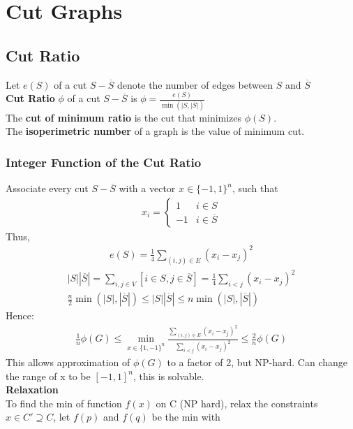 \documentclass[12pt, letterpaper]{report}
\begin{document}
    \section{Cut Graphs}
    \subsection{Cut Ratio}
    Let $e(S)$ of a cut $S-\overline{S}$ denote the number of edges between $S$ and $\overline{S}$\\
    \textbf{Cut Ratio} $\phi$ of a cut $S-\overline{S}$ is $\phi = \frac{e(S)}{\min(|S, |\overline{S}|)}$\\
    The \textbf{cut of minimum ratio} is the cut that minimizes $\phi(S)$.\\The \textbf{isoperimetric number} of a graph is the value of minimum cut.
    \subsubsection{Integer Function of the Cut Ratio}
    Associate every cut $S-\overline{S}$ with a vector $x\in \{-1, 1\}^n$, such that
    \begin{gather*}
        x_i = \begin{cases}
            1 & i \in S\\
            -1 & i \in \overline{S}
        \end{cases}
    \end{gather*}
    Thus,
    \begin{gather*}
        e(S) = \frac{1}{4} \sum_{(i,j)\in E}(x_i-x_j)^2
    \end{gather*}
    \begin{gather*}
        |S||\overline{S}| = \sum_{i,j \in V}[i \in S, j \in \overline{S}] = \frac{1}{4}\sum_{i<j}(x_i-x_j)^2\\
        \frac{n}{2}\min(|S|,|\overline{S}|)\leq |S||\overline{S}| \leq n \min{(|S|, |\overline{S}|)}
    \end{gather*}
    Hence:
    \begin{gather*}
        \frac{1}{n}\phi(G) \leq \min_{x\in \{1,-1\}^n}\frac{\sum_{(i,j)\in E}(x_i-x_j)^2}{\sum_{i<j}(x_i-x_j)^2} \leq \frac{2}{n}\phi(G)
    \end{gather*}
    This allows approximation of $\phi(G)$ to a factor of 2, but NP-hard. Can change the range of x to be $[-1, 1]^n$, this is solvable.\\
    \textbf{Relaxation}\\
    \indent To find the min of function $f(x)$ on C (NP hard), relax the constraints $x\in C'\supseteq C$, let $f(p)$ and $f(q)$ be the min with 
\end{document}
